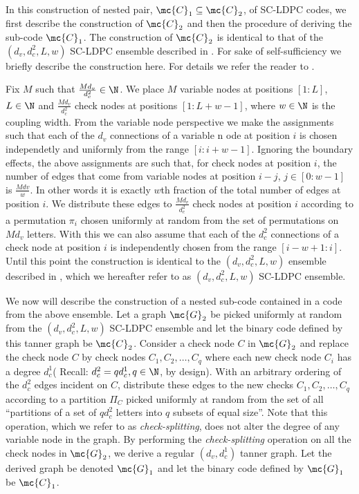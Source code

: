 \documentclass[journal]{IEEEtran}
\begin{document}
In this construction of nested pair, $\mc{C}_{1}\subseteq \mc{C}_{2}$, of SC-LDPC codes, we first describe the construction of $\mc{C}_{2}$ and then the procedure of deriving the sub-code $\mc{C}_{1}$. The construction of $\mc{C}_{2}$ is identical to that of the $(d_{v},d_{c}^{2},L,w)$ SC-LDPC ensemble described in \cite{KudekarUrbanke11}. For sake of self-sufficiency we briefly describe the construction here. For details we refer the reader to  \cite{KudekarUrbanke11}.

Fix $M$ such that $\frac{Md_{v}}{d_{c}^{2}}\in \N$. We place $M$ variable nodes at positions $[1: L]$, $L\in\N$ and $\frac{Md_{v}}{d_{c}^{2}}$ check nodes at positions $[1 : L+w-1]$, where $w\in \N$ is the coupling width. From the variable node perspective we make the assignments such that each of the $d_{v}$ connections of a variable n	ode at position $i$ is chosen independetly and uniformly from the range $[i : i+w-1]$. Ignoring the boundary effects, the above assignments are such that, for check nodes  at position $i$, the number of edges that come from variable nodes at position $i-j$, $j\in[0:w-1]$ is $\frac{Md{v}}{w}$. In other words it is exactly $w$th fraction of the total number of edges at position $i$. 
We distribute these edges to $\frac{Md_{v}}{d_{c}^{2}}$ check nodes at position $i$ according to a permutation $\pi_{i}$ chosen uniformly at random from the set of permutations on $Md_{v}$ letters. With this we can also assume that each of the $d_{c}^{2}$ connections of a check node at position $i$ is independently chosen from the range $[i-w+1 : i]$. Until this point the construction is identical to the $(d_{v},d_{c}^{2},L,w)$ ensemble described in \cite{kudekaruniversal}, which we hereafter refer to as $(d_{v},d_{c}^{2},L,w)$ SC-LDPC ensemble. 

We now will describe the construction of a nested sub-code contained in a code from the above ensemble. Let a graph $\mc{G}_{2}$ be picked uniformly at random from the  $(d_{v},d_{c}^{2},L,w)$ SC-LDPC ensemble and let the binary code defined by this tanner graph be $\mc{C}_{2}$. Consider a check node $C$ in $\mc{G}_{2}$ and
replace the check node $C$ by check nodes $C_{1}, C_{2}, \ldots, C_{q}$ where each new check node $C_{i}$ has a degree $d_{c}^{1}$( Recall: $d_{c}^{2}=q d_{c}^{1},q\in \N$, by design). With an arbitrary ordering of the $d_{c}^{2}$ edges incident on $C$, distribute these edges to the new checks $C_{1}, C_{2}, \ldots, C_{q}$ according to a partition $\Pi_{C}$ picked uniformly at random from the set of all ``partitions of a set of $qd_{c}^{2}$ letters into $q$ subsets of equal size''. 
Note that this operation, which we refer to as \textit{check-splitting}, does not alter the degree of  any variable node in the graph. By performing the \textit{check-splitting} operation on all the check nodes in $\mc{G}_{2}$, we derive a regular $(d_{v},d_{c}^{1})$ tanner graph. Let the derived graph be denoted $\mc{G}_{1}$ and let the binary code defined by $\mc{G}_{1}$ be $\mc{C}_{1}$.	
\end{document}
